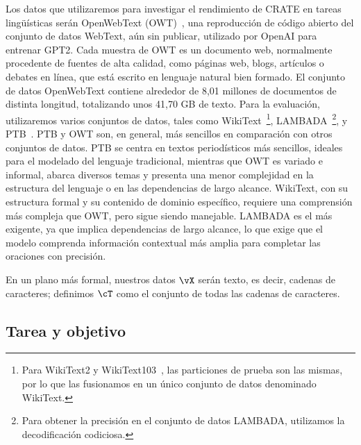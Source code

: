\documentclass[../../book-main_es.tex]{subfiles}
\begin{document}
Los datos que utilizaremos para investigar el rendimiento de CRATE en
tareas lingüísticas serán OpenWebText (OWT)~\cite{Gokaslan2019OpenWeb},
una reproducción de código abierto del conjunto de datos WebText, aún sin publicar, utilizado por
OpenAI para entrenar GPT2. Cada muestra de OWT es un documento web, normalmente
procedente de fuentes de alta calidad, como páginas web, blogs, artículos o debates en línea,
que está escrito en lenguaje natural bien formado. El
conjunto de datos OpenWebText contiene alrededor de 8,01 millones de documentos de
distinta longitud, totalizando unos 41,70 GB de texto. Para la evaluación, utilizaremos
varios conjuntos de datos, tales como
WikiText~\cite{merity2016pointer}\footnote{Para WikiText2 y
WikiText103~\cite{merity2016pointer}, las particiones de prueba son las mismas,
por lo que las fusionamos en un único conjunto de datos denominado WikiText.},
LAMBADA~\cite{paperno2016lambadadatasetwordprediction}\footnote{Para
obtener la precisión en el conjunto de datos LAMBADA, utilizamos la decodificación codiciosa.},
y PTB~\cite{marcus-etal-1993-building}. PTB y OWT son, en general,
más sencillos en comparación con otros conjuntos de datos. PTB se centra en textos periodísticos más sencillos,
ideales para el modelado del lenguaje tradicional, mientras que OWT
es variado e informal, abarca diversos temas y presenta una menor
complejidad en la estructura del lenguaje o en las dependencias de largo alcance.
WikiText, con su estructura formal y su contenido de dominio específico,
requiere una comprensión más compleja que OWT, pero sigue siendo
manejable. LAMBADA es el más exigente, ya que implica
dependencias de largo alcance, lo que exige que el modelo comprenda
información contextual más amplia para completar las oraciones con precisión.

En un plano más formal, nuestros datos \(\vX\) serán texto, es decir, cadenas de
caracteres; definimos \(\cT\) como el conjunto de todas las cadenas de caracteres.

\subsection{Tarea y objetivo} \label{sub:clm_text_objective}
\end{document}
